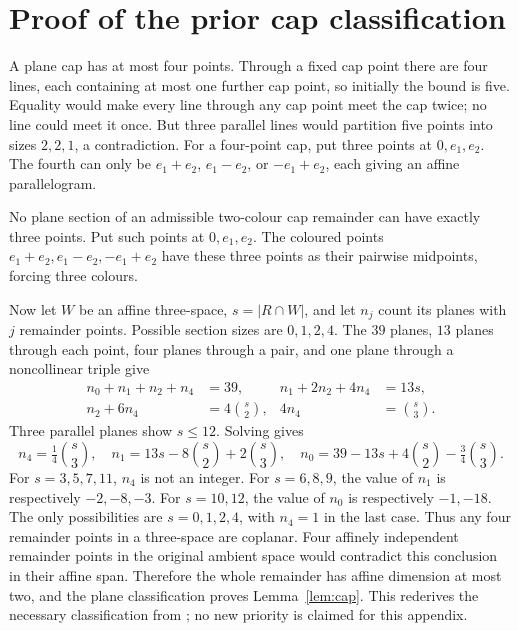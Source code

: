 \documentclass[11pt]{article}
\theoremstyle{remark}\newtheorem{remark}[theorem]{Remark}
\begin{document}
\appendix
\section{Proof of the prior cap classification}\label{app:cap}

A plane cap has at most four points. Through a fixed cap point there are
four lines, each containing at most one further cap point, so initially the
bound is five. Equality would make every line through any cap point meet
the cap twice; no line could meet it once. But three parallel lines would
partition five points into sizes $2,2,1$, a contradiction. For a four-point
cap, put three points at $0,e_1,e_2$. The fourth can only be $e_1+e_2$,
$e_1-e_2$, or $-e_1+e_2$, each giving an affine parallelogram.

No plane section of an admissible two-colour cap remainder can have exactly
three points. Put such points at $0,e_1,e_2$. The coloured points
$e_1+e_2,e_1-e_2,-e_1+e_2$ have these three points as their pairwise
midpoints, forcing three colours.

Now let $W$ be an affine three-space, $s=|R\cap W|$, and let $n_j$ count its
planes with $j$ remainder points. Possible section sizes are $0,1,2,4$.
The $39$ planes, $13$ planes through each point, four planes through a pair,
and one plane through a noncollinear triple give
\begin{align*}
 n_0+n_1+n_2+n_4&=39,& n_1+2n_2+4n_4&=13s,\\
 n_2+6n_4&=4\binom{s}{2},&4n_4&=\binom{s}{3}.
\end{align*}
Three parallel planes show $s\leq12$. Solving gives
\[
 n_4=\tfrac14\binom{s}{3},\quad
 n_1=13s-8\binom{s}{2}+2\binom{s}{3},\quad
 n_0=39-13s+4\binom{s}{2}-\tfrac34\binom{s}{3}.
\]
For $s=3,5,7,11$, $n_4$ is not an integer. For $s=6,8,9$, the value of
$n_1$ is respectively $-2,-8,-3$. For $s=10,12$, the value of $n_0$ is
respectively $-1,-18$. The only possibilities are $s=0,1,2,4$, with
$n_4=1$ in the last case. Thus any four remainder points in a three-space
are coplanar. Four affinely independent remainder points in the original
ambient space would contradict this conclusion in their affine span.
Therefore the whole remainder has affine dimension at most two, and the
plane classification proves Lemma~\ref{lem:cap}. This rederives the
necessary classification from \cite{previous}; no new priority is claimed
for this appendix.
\end{document}
